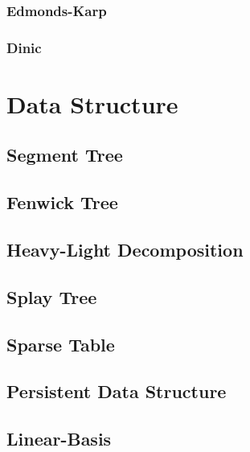 \documentclass[a4paper]{article}
\begin{document}
\subsubsection{Edmonds-Karp}



\subsubsection{Dinic}



\pagebreak

\section{Data Structure}

\subsection{Segment Tree}

\subsection{Fenwick Tree}

\subsection{Heavy-Light Decomposition}

\subsection{Splay Tree}

\subsection{Sparse Table}

\subsection{Persistent Data Structure}

\subsection{Linear-Basis}



\pagebreak
\end{document}
